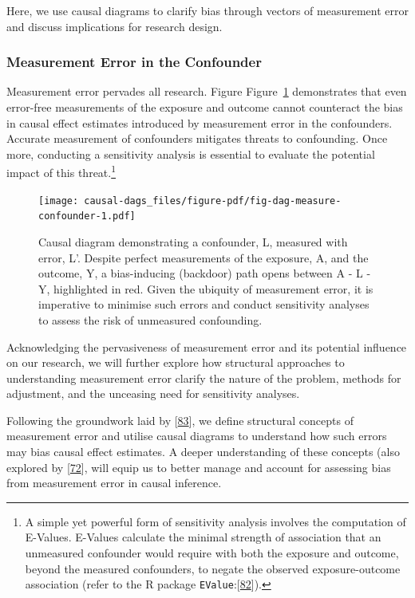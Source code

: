 \documentclass[
  singlecolumn]{article}
\begin{document}
Here, we use causal diagrams to clarify bias through vectors of
measurement error and discuss implications for research design.

\hypertarget{measurement-error-in-the-confounder}{%
\subsubsection{Measurement Error in the
Confounder}\label{measurement-error-in-the-confounder}}

Measurement error pervades all research. Figure
Figure~\ref{fig-dag-measure-confounder} demonstrates that even
error-free measurements of the exposure and outcome cannot counteract
the bias in causal effect estimates introduced by measurement error in
the confounders. Accurate measurement of confounders mitigates threats
to confounding. Once more, conducting a sensitivity analysis is
essential to evaluate the potential impact of this threat.\footnote{A
  simple yet powerful form of sensitivity analysis involves the
  computation of E-Values. E-Values calculate the minimal strength of
  association that an unmeasured confounder would require with both the
  exposure and outcome, beyond the measured confounders, to negate the
  observed exposure-outcome association (refer to the R package
  \texttt{EValue}:{[}\protect\hyperlink{ref-mathur2018}{82}{]}).}

\begin{figure}

{\centering \texttt{[image: causal-dags\_files/figure-pdf/fig-dag-measure-confounder-1.pdf]}

}

\caption{\label{fig-dag-measure-confounder}Causal diagram demonstrating
a confounder, L, measured with error, L'. Despite perfect measurements
of the exposure, A, and the outcome, Y, a bias-inducing (backdoor) path
opens between A - L - Y, highlighted in red. Given the ubiquity of
measurement error, it is imperative to minimise such errors and conduct
sensitivity analyses to assess the risk of unmeasured confounding.}

\end{figure}

Acknowledging the pervasiveness of measurement error and its potential
influence on our research, we will further explore how structural
approaches to understanding measurement error clarify the nature of the
problem, methods for adjustment, and the unceasing need for sensitivity
analyses.

Following the groundwork laid by
{[}\protect\hyperlink{ref-hernuxe1n2009}{83}{]}, we define structural
concepts of measurement error and utilise causal diagrams to understand
how such errors may bias causal effect estimates. A deeper understanding
of these concepts (also explored by
{[}\protect\hyperlink{ref-vanderweele2012}{72}{]}, will equip us to
better manage and account for assessing bias from measurement error in
causal inference.
\end{document}
